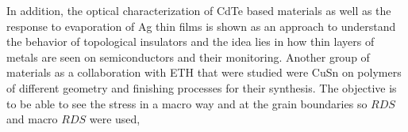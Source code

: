 In addition, the optical characterization of CdTe based materials as well as the response to evaporation of Ag thin films is shown as an approach to understand the behavior of topological insulators and the idea lies in how thin layers of metals are seen on semiconductors and their monitoring. Another group of materials as a collaboration with ETH that were studied were CuSn on polymers of different geometry and finishing processes for their synthesis. The objective is to be able to see the stress in a macro way and at the grain boundaries so $RDS$ and macro $RDS$ were used, 






%